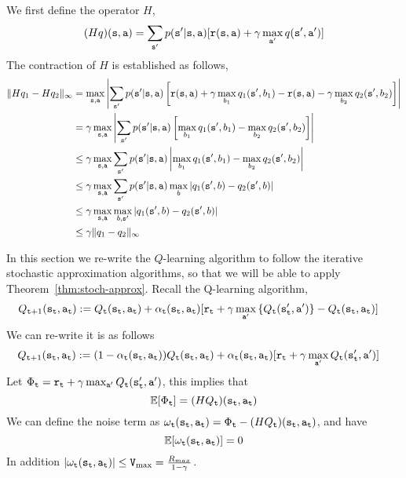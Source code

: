 We first define the operator $H$,
\[
(Hq)({\tt s},{\tt a})=\sum_{{\tt s}'}p({\tt s}'|{\tt s},{\tt a})
[{\tt r}({\tt s},{\tt a}) + \gamma \max_{{\tt a}'} q ({\tt s}',
{\tt a}')]
\]
The contraction of $H$ is established as follows,
\begin{align*}
\|Hq_{1}-Hq_{2}\|_{\infty} & =\max_{{\tt s},{\tt a}}\left|\sum_{{\tt s}'}p({\tt s}'|{\tt s},{\tt a})\left[{\tt r}({\tt s},{\tt a})+\gamma\max_{b_{1}}q_{1}({\tt s}',b_{1})-{\tt r}({\tt s},{\tt a})-\gamma\max_{b_{2}}q_{2}({\tt s}',b_{2})\right]\right|\\
& =\gamma\max_{{\tt s},{\tt a}}\left|\sum_{{\tt s}'}p({\tt s}'|{\tt s},{\tt a})\left[\max_{b_{1}}q_{1}({\tt s}',b_{1})-\max_{b_{2}}q_{2}({\tt s}',b_{2})\right]\right|\\
& \leq\gamma\max_{{\tt s},{\tt a}}\sum_{{\tt s}'}p({\tt s}'|{\tt s},{\tt a})\left|\max_{b_{1}}q_{1}({\tt s}',b_{1})-\max_{b_{2}}q_{2}({\tt s}',b_{2})\right|\\
& \leq\gamma\max_{{\tt s},{\tt a}}\sum_{{\tt s}'}p({\tt s}'|{\tt s},{\tt a})\max_{b}\left|q_{1}({\tt s}',b)-q_{2}({\tt s}',b)\right|\\
& \leq\gamma\max_{{\tt s},{\tt a}}\max_{b,{\tt s}'}\left|q_{1}({\tt s}',b)-q_{2}({\tt s}',b)\right|\\
& \leq\gamma\|q_{1}-q_{2}\|_{\infty}
\end{align*}

In this section we re-write the $Q$-learning algorithm to follow the
iterative stochastic approximation algorithms, so that we will be
able to apply Theorem~\ref{thm:stoch-approx}.
Recall the Q-learning algorithm,
\begin{align*}
	Q_{{\tt t}+1}({\tt s}_{{\tt t}},{\tt a}_{{\tt t}}) & :=Q_{{\tt t}}({\tt s}_{{\tt t}},{\tt a}_{{\tt t}})+\alpha_{{\tt t}}({\tt s}_{{\tt t}},{\tt a}_{{\tt t}})[{\tt r}_{{\tt t}}+\gamma\max_{{\tt a}'}\left\{ Q_{{\tt t}}({\tt s}_{{\tt t}}',{\tt a}')\right\} -Q_{{\tt t}}({\tt s}_{{\tt t}},{\tt a}_{{\tt t}})]
\end{align*}
We can re-write it is as follows
\begin{align*}
 Q_{{\tt t}+1}({\tt s}_{\tt t},{\tt a}_{\tt t}) & :=   (1-\alpha_{\tt t}({\tt s}_{\tt t},{\tt a}_{\tt t}) ) Q_{\tt t} ({\tt s}_{\tt t},{\tt a}_{\tt t}) + \alpha_{\tt t}({\tt s}_{\tt t},{\tt a}_{\tt t})  [{\tt r}_{\tt t} +
\gamma \max_{{\tt a}'} Q_{\tt t} ({\tt s}_{{\tt t}}',
{\tt a}')]
\end{align*}
Let $\Phi_{\tt t}={\tt r}_{\tt t} + \gamma \max_{{\tt a}'} Q_{\tt t}
({\tt s}_{{\tt t}}', {\tt a}')$, this implies that
\[\mathbb{E}[\Phi_{\tt t}]=
(HQ_{\tt t})({\tt s}_{\tt t},{\tt a}_{\tt t})\]
We can define the noise term as
$\omega_{\tt t}({\tt s}_{\tt t},{\tt a}_{\tt t})=\Phi_{\tt t}-(HQ_{\tt t})({\tt s}_{\tt t},{\tt a}_{\tt t})$, and have
\[\mathbb{E}[\omega_{\tt t}({\tt s}_{\tt t},{\tt a}_{\tt t})]=0\]
In
addition $|\omega_{\tt t}({\tt s}_{\tt t},{\tt a}_{\tt t})|\leq {\tt V}_{\max }=
\frac{R_{max}}{1-\gamma}$.

